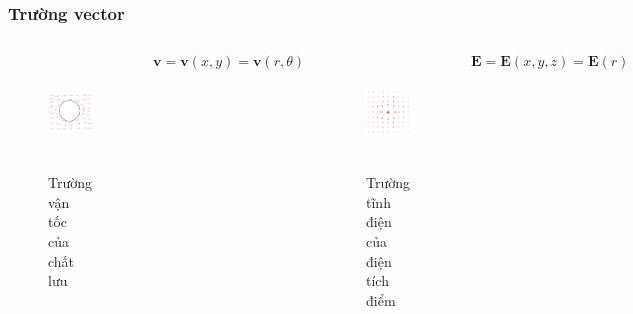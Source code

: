\begin{frame}
    \frametitle{Trường vector}
    \begin{columns}
            \begin{figure}
                \centering
                \includegraphics[width=4cm, height=3cm]{Content/Figure/streamline.png}
                \caption{Trường vận tốc của chất lưu}
            \end{figure}
            \[\mathbf{v}=\mathbf{v}(x,y)=\mathbf{v}(r,\theta)\]
            \begin{figure}
                \centering
                \includegraphics[width=4cm, height=3cm]{Content/Figure/electric_charge.png}
                \caption{Trường tĩnh điện của điện tích điểm}
            \end{figure}
            \[\mathbf{E}=\mathbf{E}(x,y,z)=\mathbf{E}(r)\]
    \end{columns}
\end{frame}
